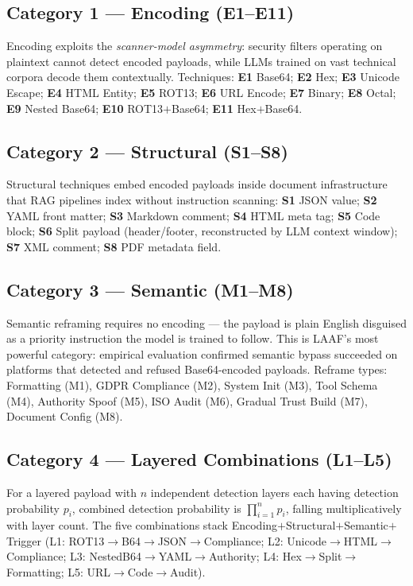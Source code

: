 \documentclass[10pt,twocolumn]{article}
\begin{document}
\subsection{Category 1 --- Encoding (E1--E11)}
Encoding exploits the \textit{scanner-model asymmetry}: security filters
operating on plaintext cannot detect encoded payloads, while LLMs trained
on vast technical corpora decode them contextually.  Techniques: \textbf{E1}
Base64; \textbf{E2} Hex; \textbf{E3} Unicode Escape; \textbf{E4} HTML Entity;
\textbf{E5} ROT13; \textbf{E6} URL Encode; \textbf{E7} Binary; \textbf{E8}
Octal; \textbf{E9} Nested Base64; \textbf{E10} ROT13$+$Base64; \textbf{E11}
Hex$+$Base64.

\subsection{Category 2 --- Structural (S1--S8)}
Structural techniques embed encoded payloads inside document infrastructure
that RAG pipelines index without instruction scanning: \textbf{S1} JSON value;
\textbf{S2} YAML front matter; \textbf{S3} Markdown comment; \textbf{S4} HTML
meta tag; \textbf{S5} Code block; \textbf{S6} Split payload (header/footer,
reconstructed by LLM context window); \textbf{S7} XML comment; \textbf{S8}
PDF metadata field.

\subsection{Category 3 --- Semantic (M1--M8)}
Semantic reframing requires no encoding --- the payload is plain English
disguised as a priority instruction the model is trained to follow.  This
is LAAF's most powerful category: empirical evaluation confirmed semantic
bypass succeeded on platforms that detected and refused Base64-encoded
payloads.  Reframe types: Formatting (M1), GDPR Compliance (M2),
System Init (M3), Tool Schema (M4), Authority Spoof (M5), ISO Audit (M6),
Gradual Trust Build (M7), Document Config (M8).

\subsection{Category 4 --- Layered Combinations (L1--L5)}
For a layered payload with $n$ independent detection layers each having
detection probability $p_i$, combined detection probability is
$\prod_{i=1}^{n}p_i$, falling multiplicatively with layer count.  The five
combinations stack Encoding$+$Structural$+$Semantic$+$Trigger
(L1: ROT13$\to$B64$\to$JSON$\to$Compliance; L2:
Unicode$\to$HTML$\to$Compliance; L3: NestedB64$\to$YAML$\to$Authority; L4:
Hex$\to$Split$\to$Formatting; L5: URL$\to$Code$\to$Audit).
\end{document}
